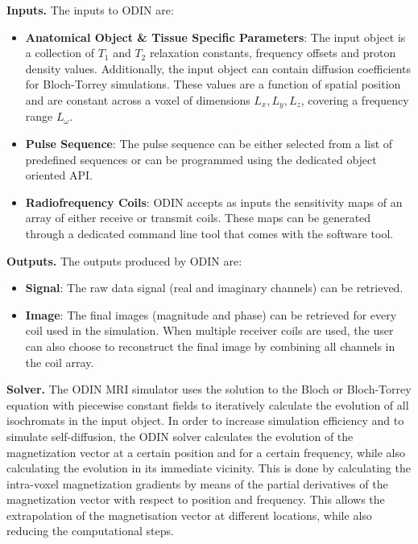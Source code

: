 \textbf{Inputs.} The inputs to ODIN are:

\begin{itemize}
    
    \item \textbf{Anatomical Object \& Tissue Specific Parameters}: 
    The input object is a collection of $T_1$ and $T_2$ relaxation constants, frequency offsets and proton density values.
    Additionally, the input object can contain diffusion coefficients for Bloch-Torrey simulations.
    These values are a function of spatial position and are constant across a voxel of dimensions $L_x, L_y, L_z$, covering a frequency range $L_{\omega}$.
    
    \item \textbf{Pulse Sequence}: The pulse sequence can be either selected from a list of predefined sequences or can be programmed using the dedicated object oriented API.
    
    \item \textbf{Radiofrequency Coils}: ODIN accepts as inputs the sensitivity maps of an array of either receive or transmit coils.
    These maps can be generated through a dedicated command line tool that comes with the software tool.
    
\end{itemize}


\hfill

\textbf{Outputs.} The outputs produced by ODIN are:
\begin{itemize}
    
    \item \textbf{Signal}: The raw data signal (real and imaginary channels) can be retrieved.
    
    \item \textbf{Image}: The final images (magnitude and phase) can be retrieved for every coil used in the simulation.
    When multiple receiver coils are used, the user can also choose to reconstruct the final image by combining all channels in the coil array.
    
\end{itemize}

\hfill

\textbf{Solver.} The ODIN MRI simulator uses the solution 
to the Bloch or Bloch-Torrey equation with piecewise constant fields to iteratively calculate the evolution of all isochromats in the input object.
In order to increase simulation efficiency and to simulate self-diffusion, the ODIN solver calculates the evolution of the magnetization vector at a certain position and for a certain frequency, while also calculating the evolution in its immediate vicinity.
This is done by calculating the intra-voxel magnetization gradients by means of the partial derivatives of the magnetization vector with respect to position and frequency.
This allows the extrapolation of the magnetisation vector at different locations, while also reducing the computational steps.

